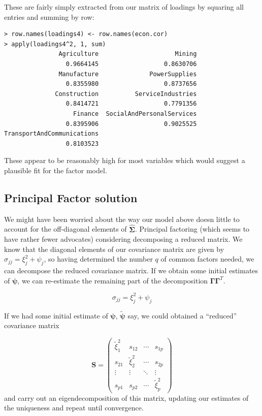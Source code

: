 These are fairly simply extracted from our matrix of loadings by squaring all entries and summing by row:

\singlespacing
\begin{verbatim}
> row.names(loadings4) <- row.names(econ.cor)
> apply(loadings4^2, 1, sum)
               Agriculture                     Mining 
                 0.9664145                  0.8630706 
               Manufacture              PowerSupplies 
                 0.8355980                  0.8737656 
              Construction          ServiceIndustries 
                 0.8414721                  0.7791356 
                   Finance  SocialAndPersonalServices 
                 0.8395906                  0.9025525 
TransportAndCommunications 
                 0.8103523 
\end{verbatim}
\onehalfspacing


These appear to be reasonably high for most variables which would suggest a plausible fit for the factor model.


\subsection{Principal Factor solution}

We might have been worried about the way our model above doesn little to account for the off-diagonal elements of $\boldsymbol{\hat{\Sigma}}$.   Principal factoring (which seems to have rather fewer advocates) considering decomposing a reduced matrix.   We know that the diagonal elements of our covariance matrix are given by $\sigma_{jj} = \xi_{j}^{2} + \psi_{j}$, so having determined the number $q$ of common factors needed, we can decompose the reduced covariance matrix.   If we obtain some initial estimates of $\boldsymbol{\psi}$, we can re-estimate the remaining part of the decomposition $\boldsymbol{\Gamma} \boldsymbol{\Gamma}^{T}$.

\begin{equation}
\sigma_{jj} = \xi_{j}^{2} + \psi_{j}
\end{equation}

If we had some initial estimate of $\boldsymbol{\psi}$, $\widetilde{\boldsymbol{\psi}}$ say,  we could obtained a ``reduced'' covariance matrix

\begin{displaymath}
\boldsymbol{S} = \left( \begin{array}{rrrr}
\widetilde{\xi}_{1}^{2} & s_{12} & \cdots & s_{1p}\\
s_{21} & \widetilde{\xi}_{2}^{2} & \cdots & s_{2p}\\
\vdots & \vdots & \ddots & \vdots \\
s_{p1} & s_{p2} & \cdots & \widetilde{\xi}_{p}^{2}
\end{array} \right) 
\end{displaymath}
and carry out an eigendecomposition of this matrix, updating our estimates of the uniqueness and repeat until convergence.

